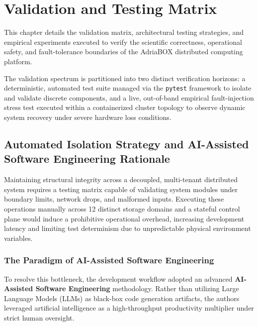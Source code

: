 \section{Validation and Testing Matrix}
\label{sec:validation}

This chapter details the validation matrix, architectural testing strategies, and empirical experiments executed to verify the scientific correctness, operational safety, and fault-tolerance boundaries of the AdriaBOX distributed computing platform. 

The validation spectrum is partitioned into two distinct verification horizons: a deterministic, automated test suite managed via the \texttt{pytest} framework to isolate and validate discrete components, and a live, out-of-band empirical fault-injection stress test executed within a containerized cluster topology to observe dynamic system recovery under severe hardware loss conditions.

\subsection{Automated Isolation Strategy and AI-Assisted Software Engineering Rationale}
Maintaining structural integrity across a decoupled, multi-tenant distributed system requires a testing matrix capable of validating system modules under boundary limits, network drops, and malformed inputs. Executing these operations manually across 12 distinct storage domains and a stateful control plane would induce a prohibitive operational overhead, increasing development latency and limiting test determinism due to unpredictable physical environment variables.

\subsubsection{The Paradigm of AI-Assisted Software Engineering}
To resolve this bottleneck, the development workflow adopted an advanced \textbf{AI-Assisted Software Engineering} methodology. Rather than utilizing Large Language Models (LLMs) as black-box code generation artifacts, the authors leveraged artificial intelligence as a high-throughput productivity multiplier under strict human oversight. 


